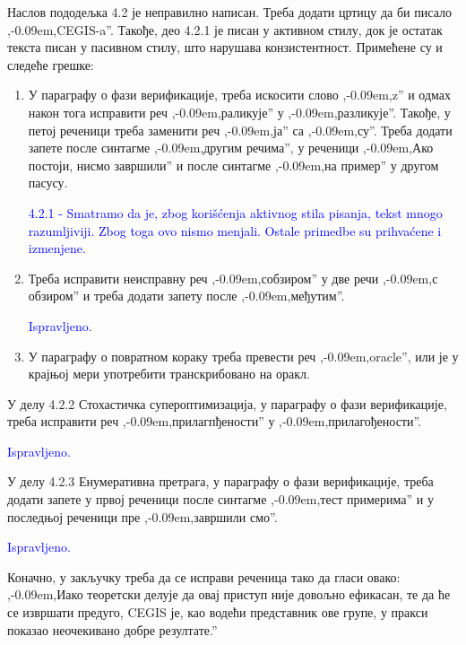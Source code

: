 \documentclass[a4paper]{report}
\newcommand{\odgovor}[1]{\textcolor{blue}{#1}}
\def\zn{,\kern-0.09em,}
\begin{document}
\par Наслов пододељка 4.2 је неправилно написан. Треба додати цртицу да би писало \zn CEGIS-a''. Такође, део 4.2.1 је писан у активном стилу, док је остатак текста писан у пасивном стилу, што нарушава конзистентност. Примећене су и следеће грешке:
\begin{enumerate}
\item У параграфу о фази верификације, треба искосити слово \zn z'' и одмах након тога исправити реч \zn раликује'' у \zn разликује''. Такође, у петој реченици треба заменити реч \zn ја'' са \zn су''. Треба додати запете после синтагме \zn другим речима'', у реченици \zn Ако постоји, нисмо завршили'' и после синтагме \zn на пример'' у другом пасусу.

\odgovor{4.2.1 - Smatramo da je, zbog korišćenja aktivnog stila pisanja, tekst mnogo razumljiviji. Zbog toga ovo nismo menjali. 
Ostale primedbe su prihvaćene i izmenjene.}

\item Треба исправити неисправну реч \zn собзиром'' у две речи \zn с обзиром'' и треба додати запету после \zn међутим''.

\odgovor{Ispravljeno.}

\item У параграфу о повратном кораку треба превести реч \zn oracle'', или је у крајњој мери употребити транскрибовано на оракл.


\end{enumerate}

\par У делу 4.2.2 Стохастичка супероптимизација, у параграфу о фази верификације, треба исправити реч \zn прилагпђености'' у \zn прилагођености''.

\odgovor{Ispravljeno.}

\par У делу 4.2.3 Енумеративна претрага, у параграфу о фази верификације, треба додати запете у првој реченици после синтагме \zn тест примерима'' и у последњој реченици пре \zn завршили смо''.

\odgovor{Ispravljeno.}

\par Коначно, у закључку треба да се исправи реченица тако да гласи овако: \zn Иако теоретски делује да овај приступ није довољно ефикасан, те да ће се извршати предуго, CEGIS је, као водећи представник ове групе, у пракси показао неочекивано добре резултате.''
\end{document}
